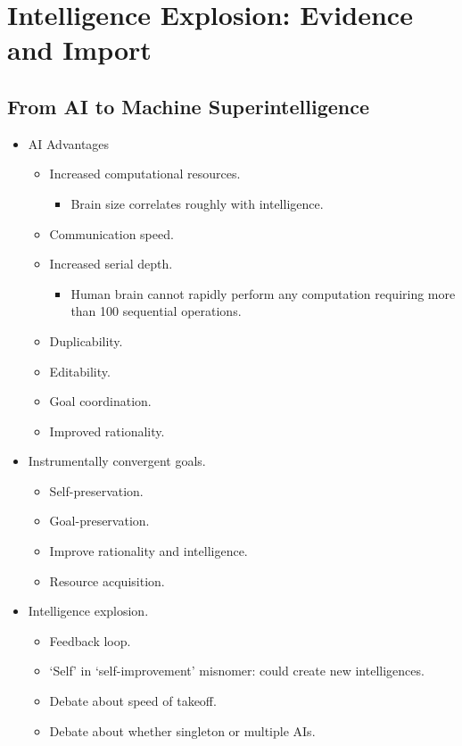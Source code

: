 \section{Intelligence Explosion: Evidence and Import}

\subsection{From AI to Machine Superintelligence}

\begin{itemize}
    \item AI Advantages
    \begin{itemize}
        \item Increased computational resources.
        \begin{itemize}
            \item Brain size correlates roughly with intelligence.
        \end{itemize}
        \item Communication speed.
        \pagebreak
        \item Increased serial depth.
        \begin{itemize}
            \item Human brain cannot rapidly perform any computation requiring more than 100 sequential operations.
        \end{itemize}
        \item Duplicability.
        \item Editability.
        \item Goal coordination.
        \item Improved rationality.
    \end{itemize}
    \item Instrumentally convergent goals.
    \begin{itemize}
        \item Self-preservation.
        \item Goal-preservation.
        \item Improve rationality and intelligence.
        \item Resource acquisition.
    \end{itemize}
    \item Intelligence explosion.
    \begin{itemize}
        \item Feedback loop.
        \item `Self' in `self-improvement' misnomer: could create new intelligences.
        \item Debate about speed of takeoff.
        \item Debate about whether singleton or multiple AIs.
    \end{itemize}
\end{itemize}


